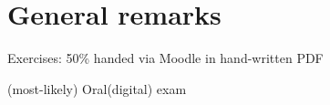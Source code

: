 


    \setcounter{section}{-1}
    \section{General remarks}
    Exercises: 50\% handed via Moodle in hand-written PDF

    (most-likely) Oral(digital) exam

    


